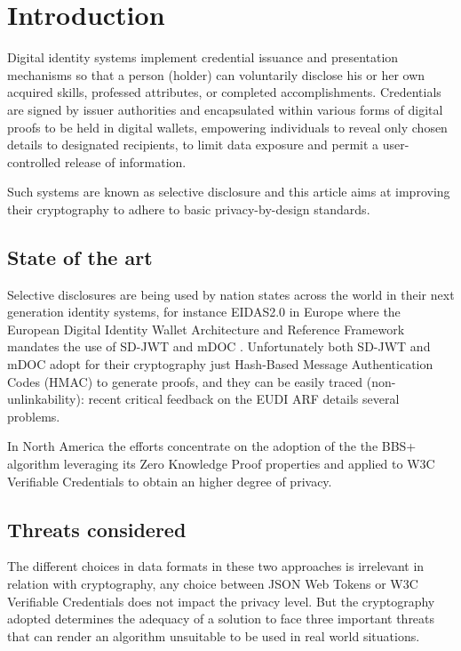 \section{Introduction}
Digital identity systems implement credential issuance and presentation mechanisms so that a person (holder) can voluntarily disclose his or her own acquired skills, professed attributes, or completed accomplishments. Credentials are signed by issuer authorities and encapsulated within various forms of digital proofs to be held in digital wallets, empowering individuals to reveal only chosen details to designated recipients, to limit data exposure and permit a user-controlled release of information.

Such systems are known as selective disclosure and this article aims at improving their cryptography to adhere to basic privacy-by-design standards.

\subsection{State of the art}

Selective disclosures are being used by nation states across the world in their next generation identity systems, for instance EIDAS2.0 in Europe where the European Digital Identity Wallet Architecture and Reference Framework\cite{eudi-arf} mandates the use of SD-JWT\cite{sd-jwt} and mDOC \cite{mdoc}. Unfortunately both SD-JWT and mDOC adopt for their cryptography just Hash-Based Message Authentication Codes (HMAC) to generate proofs, and they can be easily traced (non-unlinkability): recent critical feedback on the EUDI ARF\cite{troncoso} details several problems.


In North America the efforts concentrate on the adoption of the the BBS+ algorithm\cite{bbs+} leveraging its Zero Knowledge Proof properties and applied to W3C Verifiable Credentials\cite{w3c-vc} to obtain an higher degree of privacy.
\subsection{Threats considered}

The different choices in data formats in these two approaches is irrelevant in relation with cryptography, any choice between JSON Web Tokens or W3C Verifiable Credentials does not impact the privacy level. But the cryptography adopted determines the adequacy of a solution to face three important threats that can render an algorithm unsuitable to be used in real world situations.

